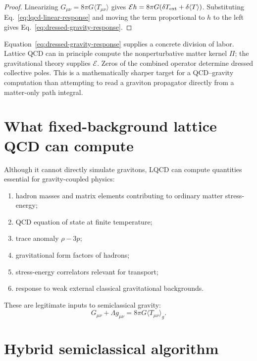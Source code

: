 \documentclass[11pt]{article}
\theoremstyle{remark}
\begin{document}
\begin{proof}
Linearizing $G_{\mu\nu}=8\pi G\langle T_{\mu\nu}\rangle$ gives $\mathcal E h=8\pi G(\delta T_{\rm ext}+\delta\langle T\rangle)$. Substituting Eq.~\eqref{eq:lqcd-linear-response} and moving the term proportional to $h$ to the left gives Eq.~\eqref{eq:dressed-gravity-response}.
\end{proof}

Equation~\eqref{eq:dressed-gravity-response} supplies a concrete division of labor. Lattice QCD can in principle compute the nonperturbative matter kernel $\Pi$; the gravitational theory supplies $\mathcal E$. Zeros of the combined operator determine dressed collective poles. This is a mathematically sharper target for a QCD--gravity computation than attempting to read a graviton propagator directly from a matter-only path integral.


\section{What fixed-background lattice QCD can compute}

Although it cannot directly simulate gravitons, LQCD can compute quantities essential for gravity-coupled physics:
\begin{enumerate}[label=(\alph*)]
\item hadron masses and matrix elements contributing to ordinary matter stress-energy;
\item QCD equation of state at finite temperature;
\item trace anomaly $\rho-3p$;
\item gravitational form factors of hadrons;
\item stress-energy correlators relevant for transport;
\item response to weak external classical gravitational backgrounds.
\end{enumerate}

These are legitimate inputs to semiclassical gravity:
\begin{equation}
G_{\mu\nu}+\Lambda g_{\mu\nu}=8\pi G\langle T_{\mu\nu}\rangle_g.
\end{equation}

\section{Hybrid semiclassical algorithm}
\end{document}
